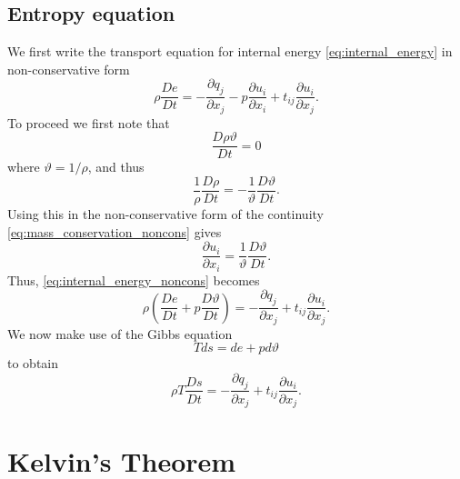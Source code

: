 \documentclass[oneside,a4paper,11pt]{report}
\begin{document}
\subsection{Entropy equation} 
We first write the transport equation for internal energy \cref{eq:internal_energy} in non-conservative form
\begin{equation}
\label{eq:internal_energy_noncons}
\rho \frac{ D e}{D t} = -\frac{\partial q_j}{\partial x_j} - p \frac{\partial u_i}{\partial x_i} + t_{ij} \frac{\partial u_i}{\partial x_j}.
\end{equation}
To proceed we first note that
\begin{equation}
    \frac{D \rho \vartheta}{Dt} = 0
\end{equation}
where $\vartheta = 1/\rho$, and thus
\begin{equation}
    \frac{1}{\rho} \frac{D \rho}{Dt} = - \frac{1}{\vartheta} \frac{ D \vartheta}{Dt}.
\end{equation}
Using this in the non-conservative form of the continuity \cref{eq:mass_conservation_noncons} gives
\begin{equation}
    \frac{\partial u_i}{\partial x_i} = \frac{1}{\vartheta} \frac{D \vartheta}{Dt}.
\end{equation}
Thus, \cref{eq:internal_energy_noncons} becomes
\begin{equation}
\rho \left ( \frac{ D e}{D t} + p\frac{D \vartheta}{Dt} \right )= -\frac{\partial q_j}{\partial x_j} + t_{ij} \frac{\partial u_i}{\partial x_j}.
\end{equation}
We now make use of the Gibbs equation
\begin{equation}
    Tds = de + p d\vartheta
\end{equation}
to obtain
\begin{equation}
\label{eq:energy_form_entropy}
\rho T \frac{ D s}{D t} = -\frac{\partial q_j}{\partial x_j} + t_{ij} \frac{\partial u_i}{\partial x_j}.
\end{equation}

\section{Kelvin's Theorem}
\end{document}
